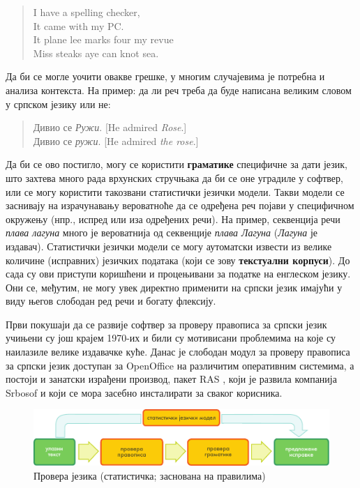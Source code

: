 \begin{multicols}{2}
\begin{quote}
 I have a spelling checker, \\
 It came with my PC. \\
 It plane lee marks four my revue \\
 Miss steaks aye can knot sea.
\end{quote}

Да би се могле уочити овакве грешке, у многим случајевима је потребна и анализа контекста. На пример: да ли реч треба да буде написана великим словом у српском језику или не: 

\begin{quote}
Дивио се \textit{Ружи}. [He admired \textit{Rose}.] \\
Дивио се \textit{ружи}. [He admired \textit{the rose}.] 
\end{quote}

Да би се ово постигло, могу се користити \textbf{граматике} специфичне за дати језик, што захтева много рада врхунских стручњака да би се оне уградиле у софтвер, или се могу користити такозвани статистички језички модели. Такви модели се заснивају на израчунавању вероватноће да се одређена реч појави у специфичном окружењу (нпр., испред или иза одређених речи). На пример, секвенција речи \textit{плава лагуна} много је вероватнија од секвенције \textit{плава Лагуна} (\textit{Лагуна} је издавач). Статистички језички модели се могу аутоматски извести из велике количине (исправних) језичких података (који се зову \textbf{текстуални корпуси}). До сада су ови приступи коришћени и процењивани за податке на енглеском језику. Они се, међутим, не могу увек директно применити на српски језик имајући у виду његов слободан ред речи и богату флексију.  


Први покушаји да се развије софтвер за проверу правописа за српски језик учињени су још крајем 1970-их \cite{UROSEVIC}  и били су мотивисани проблемима на које су наилазиле велике издавачке куће. Данас је слободан модул за проверу правописа за српски језик доступан за OpenOffice \cite{OpenOffice} на различитим оперативним системима, а постоји и занатски израђени производ, пакет RAS \cite{RASPROG}, који је развила компанија Srbosof и који се мора засебно инсталирати за сваког корисника. 

\begin{figure}[htb]
  \center
  \includegraphics[width=\textwidth]{../_media/serbian/language_checking}
  \caption{Провера језика (статистичка; заснована на правилима)}
  \label{fig:langcheckingaarch_sr}
\end{figure}


\end{multicols}
